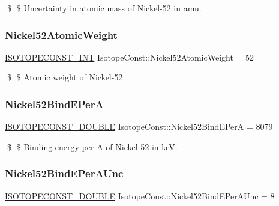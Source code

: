 \$ \$ Uncertainty in atomic mass of Nickel-\/52 in amu. \mbox{\label{group___isotope_const-_nickel-_ni52_gaa3fead71833b9c4c71b7d407989d7be8}} 
\subsubsection{\texorpdfstring{Nickel52\+Atomic\+Weight}{Nickel52AtomicWeight}}
{\footnotesize\ttfamily \mbox{\hyperlink{group___isotope_const-_macros_ga5f18360b3e99483a35c32d789e62621c}{I\+S\+O\+T\+O\+P\+E\+C\+O\+N\+S\+T\+\_\+\+I\+NT}} Isotope\+Const\+::\+Nickel52\+Atomic\+Weight = 52}

\$ \$ Atomic weight of Nickel-\/52. \mbox{\label{group___isotope_const-_nickel-_ni52_ga3089e0386d36471b815019b768d2f281}} 
\subsubsection{\texorpdfstring{Nickel52\+Bind\+E\+PerA}{Nickel52BindEPerA}}
{\footnotesize\ttfamily \mbox{\hyperlink{group___isotope_const-_macros_ga8f45a7272ce02c0b4c65c44636ed719a}{I\+S\+O\+T\+O\+P\+E\+C\+O\+N\+S\+T\+\_\+\+D\+O\+U\+B\+LE}} Isotope\+Const\+::\+Nickel52\+Bind\+E\+PerA = 8079}

\$ \$ Binding energy per A of Nickel-\/52 in keV. \mbox{\label{group___isotope_const-_nickel-_ni52_ga7d03208ae722fdec4a2853d51a340ce8}} 
\subsubsection{\texorpdfstring{Nickel52\+Bind\+E\+Per\+A\+Unc}{Nickel52BindEPerAUnc}}
{\footnotesize\ttfamily \mbox{\hyperlink{group___isotope_const-_macros_ga8f45a7272ce02c0b4c65c44636ed719a}{I\+S\+O\+T\+O\+P\+E\+C\+O\+N\+S\+T\+\_\+\+D\+O\+U\+B\+LE}} Isotope\+Const\+::\+Nickel52\+Bind\+E\+Per\+A\+Unc = 8}

